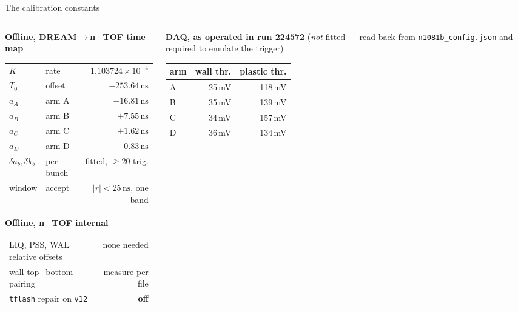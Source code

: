 \documentclass[aspectratio=169,10pt]{beamer}
\newcommand{\ns}{\,\mathrm{ns}}
\newcommand{\ntof}{n\_TOF}
\begin{document}
\begin{frame}{The calibration constants}
\vspace{-0.2em}
\begin{columns}[T]
\begin{column}{0.53\textwidth}
\small
\textbf{Offline, DREAM$\to$\ntof{} time map}\\[0.2em]
\begin{tabular}{llr}
\toprule
$K$    & rate      & $1.103724\times10^{-4}$\\
$T_0$  & offset    & $-253.64\ns$\\
$a_A$  & arm A     & $-16.81\ns$\\
$a_B$  & arm B     & $+7.55\ns$\\
$a_C$  & arm C     & $+1.62\ns$\\
$a_D$  & arm D     & $-0.83\ns$\\
$\delta a_b,\delta k_b$ & per bunch & fitted, $\geq$20 trig.\\
window & accept    & $|r| < 25\ns$, one band\\
\bottomrule
\end{tabular}
\vspace{0.5em}

\textbf{Offline, \ntof{} internal}\\[0.2em]
\begin{tabular}{lr}
\toprule
LIQ, PSS, WAL relative offsets & none needed\\
wall top$-$bottom pairing      & measure per file\\
\texttt{tflash} repair on \texttt{v12} & \textbf{off}\\
\bottomrule
\end{tabular}
\end{column}
\begin{column}{0.45\textwidth}
\small
\textbf{DAQ, as operated in run 224572} (\emph{not} fitted --- read back from
\texttt{n1081b\_config.json} and required to emulate the trigger)\\[0.3em]
\begin{tabular}{lrr}
\toprule
arm & wall thr. & plastic thr.\\
\midrule
A & 25\,mV & 118\,mV\\
B & 35\,mV & 139\,mV\\
C & 34\,mV & 157\,mV\\
D & 36\,mV & 134\,mV\\
\bottomrule
\end{tabular}
\vspace{0.7em}


\end{column}
\end{columns}
\end{frame}
\end{document}
